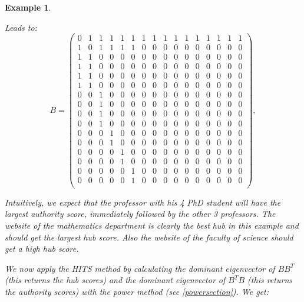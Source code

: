 \documentclass[a4paper,11pt]{report}
\newtheorem{example}[theorem]{Example}
\begin{document}
\begin{example}
\begin{itemize}
\end{itemize}
Leads to:
$$
 B= \begin{pmatrix} 
0 & 1 & 1 & 1 & 1 & 1 & 1 & 1 & 1 & 1 & 1  & 1 & 1 & 1 & 1 & 1\\
1 & 0 & 1 & 1 & 1 & 1 & 0 & 0 & 0 & 0 & 0 & 0 & 0 & 0 & 0 & 0 \\
1 & 1 & 0 & 0 & 0 & 0 & 0 & 0 & 0 & 0 & 0 & 0 & 0 & 0 & 0 & 0 \\
1 & 1 & 0 & 0 & 0 & 0 & 0 & 0 & 0 & 0 & 0 & 0 & 0 & 0 & 0 & 0 \\
1 & 1 & 0 & 0 & 0 & 0 & 0 & 0 & 0 & 0 & 0 & 0 & 0 & 0 & 0 & 0 \\
1 & 1 & 0 & 0 & 0 & 0 & 0 & 0 & 0 & 0 & 0 & 0 & 0 & 0 & 0 & 0 \\
0 & 0 & 1 & 0 & 0 & 0 & 0 & 0 & 0 & 0 & 0 & 0 & 0 & 0 & 0 & 0 \\
0 & 0 & 1 & 0 & 0 & 0 & 0 & 0 & 0 & 0 & 0 & 0 & 0 & 0 & 0 & 0 \\
0 & 0 & 1 & 0 & 0 & 0 & 0 & 0 & 0 & 0 & 0 & 0 & 0 & 0 & 0 & 0 \\
0 & 0 & 1 & 0 & 0 & 0 & 0 & 0 & 0 & 0 & 0 & 0 & 0 & 0 & 0 & 0 \\
0 & 0 & 0 & 1 & 0 & 0 & 0 & 0 & 0 & 0 & 0 & 0 & 0 & 0 & 0 & 0 \\
0 & 0 & 0 & 1 & 0 & 0 & 0 & 0 & 0 & 0 & 0 & 0 & 0 & 0 & 0 & 0 \\
0 & 0 & 0 & 0 & 1 & 0 & 0 & 0 & 0 & 0 & 0 & 0 & 0 & 0 & 0 & 0 \\
0 & 0 & 0 & 0 & 1 & 0 & 0 & 0 & 0 & 0 & 0 & 0 & 0 & 0 & 0 & 0 \\
0 & 0 & 0 & 0 & 0 & 1 & 0 & 0 & 0 & 0 & 0 & 0 & 0 & 0 & 0 & 0 \\
0 & 0 & 0 & 0 & 0 & 1 & 0 & 0 & 0 & 0 & 0 & 0 & 0 & 0 & 0 & 0 \\
\end{pmatrix},$$

Intuitively, we expect that the professor with his 4 PhD 
student will have the largest authority score, immediately followed by the other 3 professors.
The website of the mathematics department is clearly the best hub in this example and should get the largest hub score.
Also the website of the faculty of science should get a high hub score.

We now apply the HITS method by
calculating the dominant eigenvector of $BB^T$ (this returns the hub scores) 
and the dominant eigenvector of $B^TB$ (this returns the authority scores) with 
the power method (see \ref{powersection}). We get:



\end{example}
\end{document}
